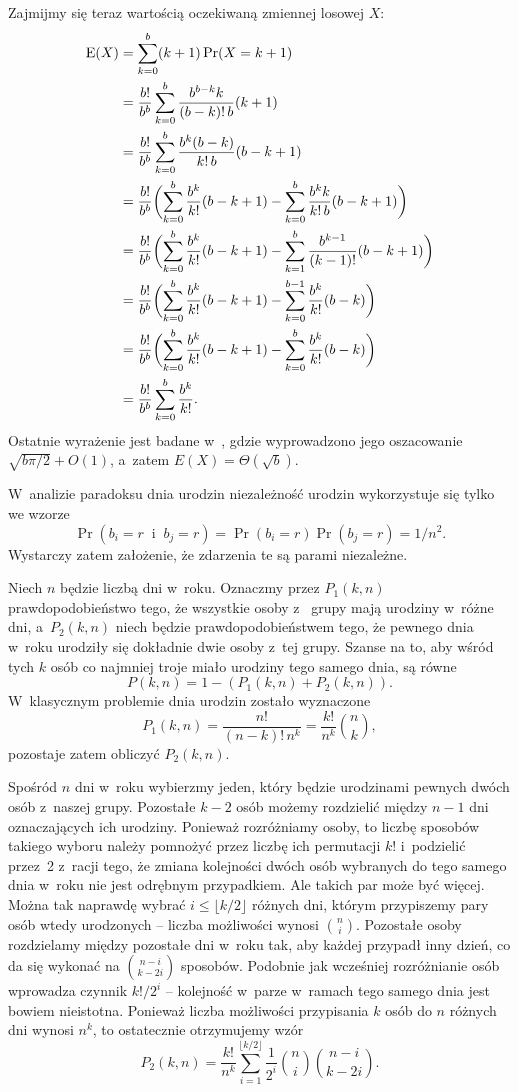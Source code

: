 Zajmijmy się teraz wartością oczekiwaną zmiennej losowej $X$:
\begin{align*}
	\operatorname{E}(X) &= \sum_{k=0}^b(k+1)\Pr(X=k+1) \\
	&= \frac{b!}{b^b}\sum_{k=0}^b\frac{b^{b-k}k}{(b-k)!\,b}(k+1) \\
	&= \frac{b!}{b^b}\sum_{k=0}^b\frac{b^k(b-k)}{k!\,b}(b-k+1) \\
	&= \frac{b!}{b^b}\biggl(\sum_{k=0}^b\frac{b^k}{k!}(b-k+1)-\sum_{k=0}^b\frac{b^kk}{k!\,b}(b-k+1)\biggr) \\
	&= \frac{b!}{b^b}\biggl(\sum_{k=0}^b\frac{b^k}{k!}(b-k+1)-\sum_{k=1}^b\frac{b^{k-1}}{(k-1)!}(b-k+1)\biggr) \\
	&= \frac{b!}{b^b}\biggl(\sum_{k=0}^b\frac{b^k}{k!}(b-k+1)-\sum_{k=0}^{b-1}\frac{b^k}{k!}(b-k)\biggr) \\
	&= \frac{b!}{b^b}\biggl(\sum_{k=0}^b\frac{b^k}{k!}(b-k+1)-\sum_{k=0}^b\frac{b^k}{k!}(b-k)\biggr) \\
	&= \frac{b!}{b^b}\sum_{k=0}^b\frac{b^k}{k!}.
\end{align*}
Ostatnie wyrażenie jest badane w~\cite{taocp1frag}, gdzie wyprowadzono jego oszacowanie $\sqrt{b\pi/2}+O(1)$, a~zatem $E(X)=\Theta(\!\sqrt{b})$.

\exercise %
W~analizie paradoksu dnia urodzin niezależność urodzin wykorzystuje się tylko we wzorze
\[
    \Pr(b_i=r\;\;\text{i}\;\;b_j=r) = \Pr(b_i=r)\Pr(b_j=r) = 1/n^2.
\]
Wystarczy zatem założenie, że zdarzenia te są parami niezależne.

\exercise %
Niech $n$ będzie liczbą dni w~roku. Oznaczmy przez $P_1(k,n)$ prawdopodobieństwo tego, że wszystkie osoby z~ grupy mają urodziny w~różne dni, a~$P_2(k,n)$ niech będzie prawdopodobieństwem tego, że pewnego dnia w~roku urodziły się dokładnie dwie osoby z~tej grupy. Szanse na to, aby wśród tych $k$ osób co najmniej troje miało urodziny tego samego dnia, są równe
\[
	P(k,n) = 1-(P_1(k,n)+P_2(k,n)).
\]
W~klasycznym problemie dnia urodzin zostało wyznaczone
\[
	P_1(k,n) = \frac{n!}{(n-k)!\,n^k} = \frac{k!}{n^k}\binom{n}{k},
\]
pozostaje zatem obliczyć $P_2(k,n)$.

Spośród $n$ dni w~roku wybierzmy jeden, który będzie urodzinami pewnych dwóch osób z~naszej grupy. Pozostałe $k-2$ osób możemy rozdzielić między $n-1$ dni oznaczających ich urodziny. Ponieważ rozróżniamy osoby, to liczbę sposobów takiego wyboru należy pomnożyć przez liczbę ich permutacji $k!$ i~podzielić przez~2 z~racji tego, że zmiana kolejności dwóch osób wybranych do tego samego dnia w~roku nie jest odrębnym przypadkiem. Ale takich par może być więcej. Można tak naprawdę wybrać $i\le\lfloor k/2\rfloor$ różnych dni, którym przypiszemy pary osób wtedy urodzonych -- liczba możliwości wynosi $\binom{n}{i}$. Pozostałe osoby rozdzielamy między pozostałe dni w~roku tak, aby każdej przypadł inny dzień, co da się wykonać na $\binom{n-i}{k-2i}$ sposobów. Podobnie jak wcześniej rozróżnianie osób wprowadza czynnik $k!/2^i$ -- kolejność w~parze w~ramach tego samego dnia jest bowiem nieistotna. Ponieważ liczba możliwości przypisania $k$ osób do $n$ różnych dni wynosi $n^k$, to ostatecznie otrzymujemy wzór
\[
	P_2(k,n) = \frac{k!}{n^k}\sum_{i=1}^{\lfloor k/2\rfloor}\frac{1}{2^i}\binom{n}{i}\binom{n-i}{k-2i}.
\]

